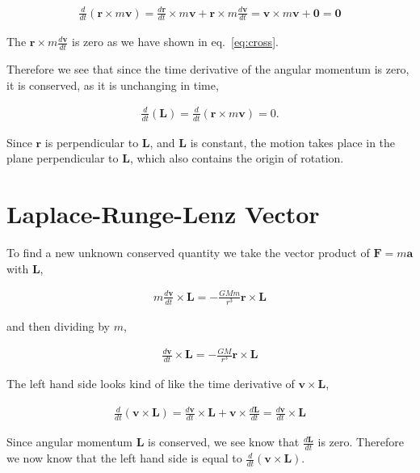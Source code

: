 \documentclass[11pt]{amsart}
\begin{document}
\begin{align*}
  \frac{d}{dt}\left(\mathbf{r}\times m\mathbf{v}\right) = \frac{d\mathbf{r}}{dt}\times m\mathbf{v} + \mathbf{r}\times m\frac{d\mathbf{v}}{dt} = \mathbf{v}\times m\mathbf{v} + \mathbf{0} = \mathbf{0}
\end{align*}

The $\mathbf{r}\times m\frac{d\mathbf{v}}{dt}$ is zero as we have shown in eq.~\ref{eq:cross}.

Therefore we see that since the time derivative of the angular momentum is zero, it is conserved, as it is unchanging in time,

\begin{align*}
  \frac{d}{dt}\left(\mathbf{L}\right) = \frac{d}{dt}\left(\mathbf{r}\times m\mathbf{v}\right) = 0.
\end{align*}

Since $\mathbf{r}$ is perpendicular to $\mathbf{L}$, and $\mathbf{L}$ is constant, the motion takes place in the plane perpendicular to $\mathbf{L}$, which also contains the origin of rotation.

\section{Laplace-Runge-Lenz Vector}

To find a new unknown conserved quantity we take the vector product of $\mathbf{F} = m\mathbf{a}$ with $\mathbf{L}$,

\begin{align*}
  m\frac{d\mathbf{v}}{dt}\times\mathbf{L} = -\frac{GMm}{r^3}\mathbf{r}\times\mathbf{L}
\end{align*}

and then dividing by $m$,

\begin{align}
  \label{crossedwithL}
  \frac{d\mathbf{v}}{dt}\times\mathbf{L} = -\frac{GM}{r^3}\mathbf{r}\times\mathbf{L}
\end{align}

The left hand side looks kind of like the time derivative of $\mathbf{v}\times\mathbf{L}$,

\begin{align*}
  \frac{d}{dt}\left(\mathbf{v}\times\mathbf{L}\right) = \frac{d\mathbf{v}}{dt}\times\mathbf{L} + \mathbf{v}\times\frac{d\mathbf{L}}{dt} = \frac{d\mathbf{v}}{dt}\times\mathbf{L}
\end{align*}

Since angular momentum $\mathbf{L}$ is conserved, we see know that $\frac{d\mathbf{L}}{dt}$ is zero. Therefore we now know that the left hand side is equal to $\frac{d}{dt}\left(\mathbf{v}\times\mathbf{L}\right)$.
\end{document}
